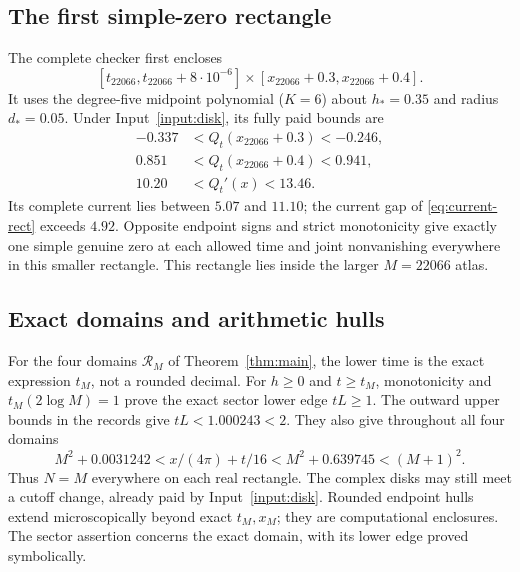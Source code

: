 \documentclass[11pt]{article}
\numberwithin{equation}{section}
\theoremstyle{definition}
\theoremstyle{remark}
\begin{document}
\subsection{The first simple-zero rectangle}
The complete checker first encloses
\[
 [t_{22066},t_{22066}+8\cdot10^{-6}]
       \times[x_{22066}+0.3,x_{22066}+0.4].
\]
It uses the degree-five midpoint polynomial ($K=6$) about $h_*=0.35$
and radius $d_*=0.05$. Under Input~\ref{input:disk}, its fully
paid bounds are \cite{micro3}
\begin{align}
 -0.337&<Q_t(x_{22066}+0.3)<-0.246,\nonumber\\
 0.851&<Q_t(x_{22066}+0.4)<0.941,\\
 10.20&<Q_t'(x)<13.46.\nonumber
\end{align}
Its complete current lies between $5.07$ and $11.10$; the current
gap of \eqref{eq:current-rect} exceeds $4.92$. Opposite endpoint
signs and strict monotonicity give exactly one simple genuine zero
at each allowed time and joint nonvanishing everywhere in this smaller
rectangle. This rectangle lies inside the larger $M=22066$ atlas.

\subsection{Exact domains and arithmetic hulls}
For the four domains $\mathcal R_M$ of Theorem~\ref{thm:main},
the lower time is the exact expression $t_M$, not a rounded decimal.
For $h\ge0$ and $t\ge t_M$, monotonicity and
$t_M(2\log M)=1$ prove the exact sector lower edge $tL\ge1$.
The outward upper bounds in the records give $tL<1.000243<2$.
They also give throughout all four domains
\begin{equation}
 M^2+0.0031242<x/(4\pi)+t/16<M^2+0.639745<(M+1)^2.
 \label{eq:cutoff-check}
\end{equation}
Thus $N=M$ everywhere on each real rectangle. The complex disks may
still meet a cutoff change, already paid by Input~\ref{input:disk}.
Rounded endpoint hulls extend microscopically beyond exact $t_M,x_M$;
they are computational enclosures. The sector assertion concerns the
exact domain, with its lower edge proved symbolically.
\end{document}
